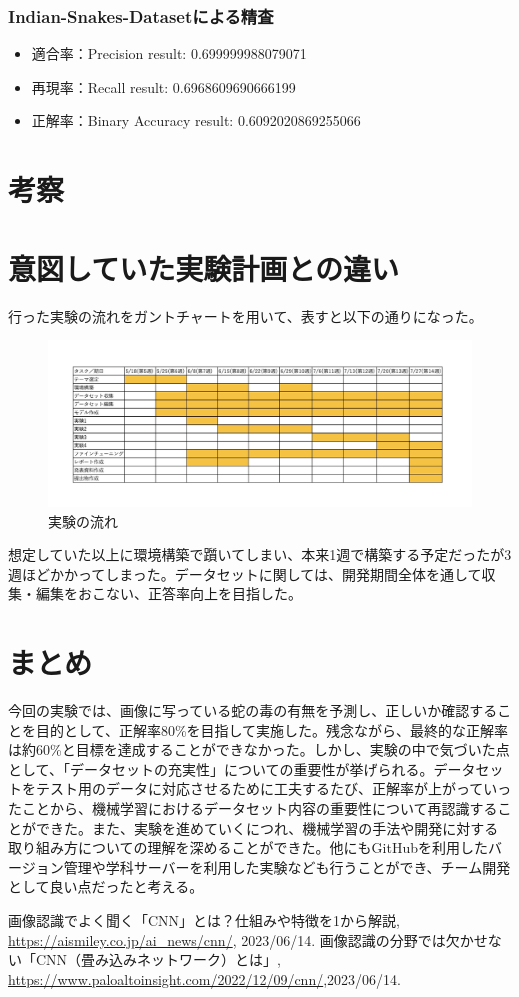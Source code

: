 \documentclass[a4paper, 11pt, titlepage]{jsarticle}
\begin{document}
\subsubsection{Indian-Snakes-Datasetによる精査}
\begin{itemize}
\item 適合率：Precision result: 0.699999988079071
\item 再現率：Recall result: 0.6968609690666199
\item 正解率：Binary Accuracy result: 0.6092020869255066
\end{itemize}

\section{考察}

\clearpage

\section{意図していた実験計画との違い}
行った実験の流れをガントチャートを用いて、表すと以下の通りになった。\par
\begin{figure}[htbp]
\begin{center}
\includegraphics[width=150mm]{G2_Ganttchart.jpeg}
\caption{実験の流れ}
\end{center}
\end{figure}
想定していた以上に環境構築で躓いてしまい、本来1週で構築する予定だったが3週ほどかかってしまった。データセットに関しては、開発期間全体を通して収集・編集をおこない、正答率向上を目指した。

\section{まとめ}
今回の実験では、画像に写っている蛇の毒の有無を予測し、正しいか確認することを目的として、正解率80\%を目指して実施した。残念ながら、最終的な正解率は約60\%と目標を達成することができなかった。しかし、実験の中で気づいた点として、「データセットの充実性」についての重要性が挙げられる。データセットをテスト用のデータに対応させるために工夫するたび、正解率が上がっていったことから、機械学習におけるデータセット内容の重要性について再認識することができた。また、実験を進めていくにつれ、機械学習の手法や開発に対する取り組み方についての理解を深めることができた。他にもGitHubを利用したバージョン管理や学科サーバーを利用した実験なども行うことができ、チーム開発として良い点だったと考える。

\begin{thebibliography}{n}
	画像認識でよく聞く「CNN」とは？仕組みや特徴を1から解説, \url{https://aismiley.co.jp/ai_news/cnn/}, 2023/06/14.
	画像認識の分野では欠かせない「CNN（畳み込みネットワーク）とは」, \url{https://www.paloaltoinsight.com/2022/12/09/cnn/},2023/06/14.
\end{thebibliography}
\end{document}
